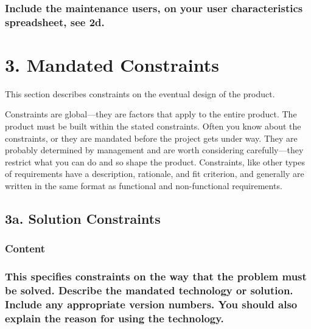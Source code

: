 \documentclass[
]{article}
\begin{document}
\hypertarget{include-the-maintenance-users-on-your-user-characteristics-spreadsheet-see-2d.}{%
\subsubsection{Include the maintenance users, on your user
characteristics spreadsheet, see
2d.}\label{include-the-maintenance-users-on-your-user-characteristics-spreadsheet-see-2d.}}

\hypertarget{mandated-constraints}{%
\section{3. Mandated Constraints}\label{mandated-constraints}}

This section describes constraints on the eventual design of the
product.

Constraints are global---they are factors that apply to the entire
product. The product must be built within the stated constraints. Often
you know about the constraints, or they are mandated before the project
gets under way. They are probably determined by management and are worth
considering carefully---they restrict what you can do and so shape the
product. Constraints, like other types of requirements have a
description, rationale, and fit criterion, and generally are written in
the same format as functional and non-functional requirements.

\hypertarget{a.-solution-constraints}{%
\subsection{\texorpdfstring{3a. Solution Constraints
}{3a. Solution Constraints }}\label{a.-solution-constraints}}

\hypertarget{content-10}{%
\subsubsection{Content}\label{content-10}}

\hypertarget{this-specifies-constraints-on-the-way-that-the-problem-must-be-solved.-describe-the-mandated-technology-or-solution.-include-any-appropriate-version-numbers.-you-should-also-explain-the-reason-for-using-the-technology.}{%
\subsubsection{This specifies constraints on the way that the problem
must be solved. Describe the mandated technology or solution. Include
any appropriate version numbers. You should also explain the reason for
using the
technology.}\label{this-specifies-constraints-on-the-way-that-the-problem-must-be-solved.-describe-the-mandated-technology-or-solution.-include-any-appropriate-version-numbers.-you-should-also-explain-the-reason-for-using-the-technology.}}
\end{document}
